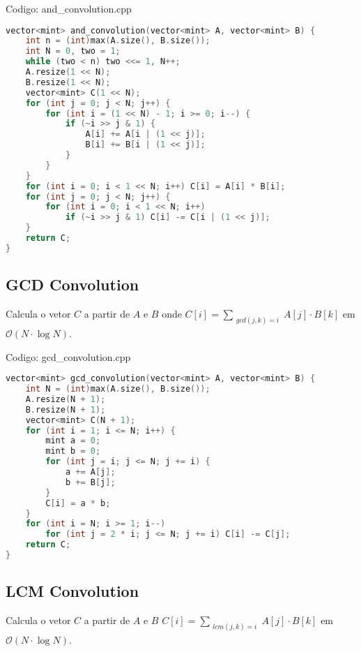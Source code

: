 \documentclass[10pt, a4paper, oneside]{book}
\begin{document}
\hfill

Codigo: and\_convolution.cpp

\begin{lstlisting}[language=C++]
vector<mint> and_convolution(vector<mint> A, vector<mint> B) {
    int n = (int)max(A.size(), B.size());
    int N = 0, two = 1;
    while (two < n) two <<= 1, N++;
    A.resize(1 << N);
    B.resize(1 << N);
    vector<mint> C(1 << N);
    for (int j = 0; j < N; j++) {
        for (int i = (1 << N) - 1; i >= 0; i--) {
            if (~i >> j & 1) {
                A[i] += A[i | (1 << j)];
                B[i] += B[i | (1 << j)];
            }
        }
    }
    for (int i = 0; i < 1 << N; i++) C[i] = A[i] * B[i];
    for (int j = 0; j < N; j++) {
        for (int i = 0; i < 1 << N; i++)
            if (~i >> j & 1) C[i] -= C[i | (1 << j)];
    }
    return C;
}
\end{lstlisting}
\hfill

\subsection{GCD Convolution}


Calcula o vetor $C$ a partir de $A$ e $B$ onde $C[i] = \sum_{\substack{gcd(j, k) = i}} A[j] \cdot B[k]$ em $\mathcal{O}(N \cdot \log N)$.

\hfill

Codigo: gcd\_convolution.cpp

\begin{lstlisting}[language=C++]
vector<mint> gcd_convolution(vector<mint> A, vector<mint> B) {
    int N = (int)max(A.size(), B.size());
    A.resize(N + 1);
    B.resize(N + 1);
    vector<mint> C(N + 1);
    for (int i = 1; i <= N; i++) {
        mint a = 0;
        mint b = 0;
        for (int j = i; j <= N; j += i) {
            a += A[j];
            b += B[j];
        }
        C[i] = a * b;
    }
    for (int i = N; i >= 1; i--)
        for (int j = 2 * i; j <= N; j += i) C[i] -= C[j];
    return C;
}
\end{lstlisting}
\hfill

\subsection{LCM Convolution}


Calcula o vetor $C$ a partir de $A$ e $B$ $C[i] = \sum_{\substack{lcm(j, k) = i}} A[j] \cdot B[k]$ em $\mathcal{O}(N \cdot \log N)$.

\hfill
\end{document}
